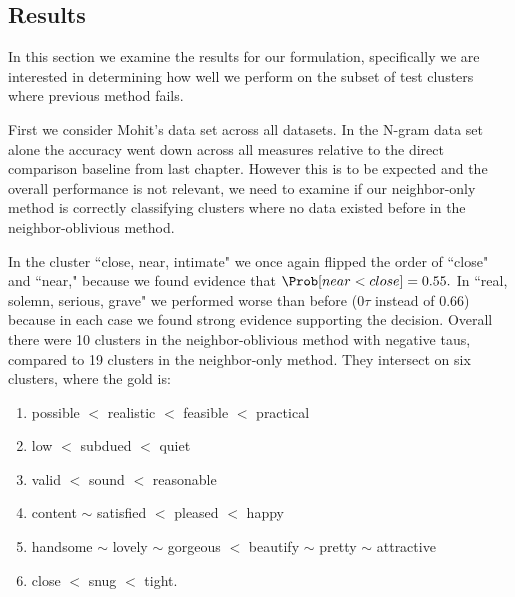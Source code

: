 \subsection{Results}

In this section we examine the results for our formulation, specifically we are interested in determining how well we perform on the subset of test clusters where previous method fails. 

First we consider Mohit's data set across all datasets. In the N-gram data set alone the accuracy went down across all measures relative to the direct comparison baseline from last chapter. However this is to be expected and the overall performance is not relevant, we need to examine if our neighbor-only method is correctly classifying clusters where no data existed before in the neighbor-oblivious method.  

In the cluster ``close, near, intimate" we once again flipped the order of ``close" and ``near," because we found evidence that $\Prob[ near < close ] = 0.55.$ In ``real, solemn, serious, grave" we performed worse than before ($0 \tau$ instead of $0.66$) because in each case we found strong evidence supporting the decision. Overall there were 10 clusters in the neighbor-oblivious method with negative taus, compared to 19 clusters in the neighbor-only method. They intersect on six clusters, where the gold is:

\begin{enumerate}
	\item possible $<$ realistic $<$ feasible $<$ practical
	\item low $<$ subdued $<$ quiet
	\item valid $<$ sound $<$ reasonable
	\item content $\sim$ satisfied $<$ pleased $<$ happy
	\item handsome $\sim$ lovely $\sim$ gorgeous $<$ beautify $\sim$ pretty $\sim$ attractive
	\item close $<$ snug $<$ tight.
\end{enumerate}

